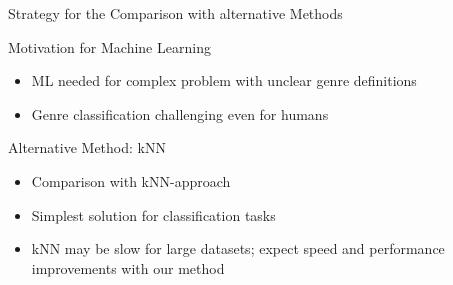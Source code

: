 \documentclass[8pt]{beamer}
\begin{document}
\begin{frame}{Strategy for the Comparison with alternative Methods}
  \begin{alertblock}{Motivation for Machine Learning}
	\begin{itemize}
          \item ML needed for complex problem with unclear genre definitions
          \item Genre classification challenging even for humans
    \end{itemize}
  \end{alertblock}
  \begin{alertblock}{Alternative Method: kNN}
    \begin{itemize}
          \item Comparison with kNN-approach
          \item Simplest solution for classification tasks
          \item kNN may be slow for large datasets; expect speed and performance improvements with our method
    \end{itemize}
  \end{alertblock}
\end{frame}



\printbibliography
\end{document}
